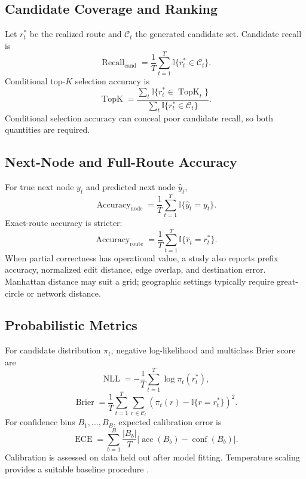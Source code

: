\documentclass[11pt,letterpaper]{article}
\newcommand{\Ccal}{\mathcal{C}}
\newcommand{\ind}{\mathbb{I}}
\begin{document}
\subsection{Candidate Coverage and Ranking}

Let $r_t^*$ be the realized route and $\Ccal_t$ the generated candidate set. Candidate recall is
\begin{equation}
\operatorname{Recall}_{\mathrm{cand}}
=\frac{1}{T}\sum_{t=1}^{T}\ind\{r_t^*\in\Ccal_t\}.
\end{equation}
Conditional top-$K$ selection accuracy is
\begin{equation}
\operatorname{TopK}
=\frac{\sum_t\ind\{r_t^*\in\operatorname{TopK}_t\}}
{\sum_t\ind\{r_t^*\in\Ccal_t\}}.
\end{equation}
Conditional selection accuracy can conceal poor candidate recall, so both quantities are required.

\subsection{Next-Node and Full-Route Accuracy}

For true next node $y_t$ and predicted next node $\widehat y_t$,
\begin{equation}
\operatorname{Accuracy}_{\mathrm{node}}
=\frac{1}{T}\sum_{t=1}^{T}\ind\{\widehat y_t=y_t\}.
\end{equation}
Exact-route accuracy is stricter:
\begin{equation}
\operatorname{Accuracy}_{\mathrm{route}}
=\frac{1}{T}\sum_{t=1}^{T}\ind\{\widehat r_t=r_t^*\}.
\end{equation}
When partial correctness has operational value, a study also reports prefix accuracy, normalized edit distance, edge overlap, and destination error. Manhattan distance may suit a grid; geographic settings typically require great-circle or network distance.

\subsection{Probabilistic Metrics}

For candidate distribution $\pi_t$, negative log-likelihood and multiclass Brier score are
\begin{equation}
\operatorname{NLL}=-\frac{1}{T}\sum_{t=1}^{T}\log\pi_t(r_t^*),
\end{equation}
\begin{equation}
\operatorname{Brier}=\frac{1}{T}\sum_{t=1}^{T}
\sum_{r\in\Ccal_t}\left(\pi_t(r)-\ind\{r=r_t^*\}\right)^2.
\end{equation}
For confidence bins $B_1,\ldots,B_B$, expected calibration error is
\begin{equation}
\operatorname{ECE}=\sum_{b=1}^{B}\frac{\lvert B_b\rvert}{T}
\left\lvert\operatorname{acc}(B_b)-\operatorname{conf}(B_b)\right\rvert.
\end{equation}
Calibration is assessed on data held out after model fitting. Temperature scaling provides a suitable baseline procedure \cite{guo2017}.
\end{document}
